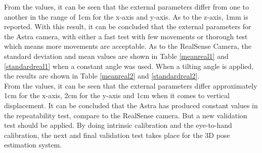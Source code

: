 From the values, it can be seen that the external parameters differ from one to another in the range of 1cm for the x-axis and y-axis. As to the z-axis, 1mm is reported. With this result, it can be concluded that the external parameters for the Astra camera, with either a fast test with few movements or thorough test which means more movements are acceptable.
As to the RealSense Camera, the standard deviation and mean values are shown in Table \ref{meanreal1} and \ref{standardreal1} when a constant angle was used. When a tilting angle is applied, the results are shown in Table \ref{meanreal2} and \ref{standardreal2}.\\
From the values, it can be seen that the external parameters differ approximately 1cm for the x-axis, 2cm for the y-axis and 1cm  when it comes to vertical displacement.  It can be concluded that the Astra has produced constant values in the repeatability test, compare to the RealSense camera. But a new validation test should be applied. 
By doing intrinsic calibration and the eye-to-hand calibration, the next and final validation test takes place for the 3D pose estimation system.

